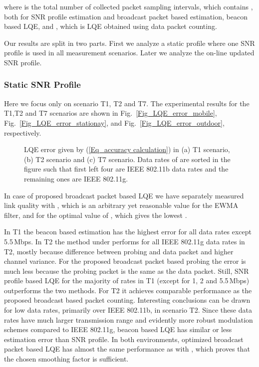 \documentclass[11pt,draftclsnofoot,journal,onecolumn]{IEEEtran}
\begin{document}
where  is the total number of collected packet sampling intervals, which contains , both for SNR profile estimation and broadcast packet based estimation, beacon based LQE, and , which is LQE obtained using data packet counting.

Our results are split in two parts. First we analyze a static profile where one SNR profile is used in all measurement scenarios. Later we analyze the on-line updated SNR profile.

\subsubsection{Static SNR Profile}
\label{sec:result_static_profile}

Here we focus only on scenario T1, T2 and T7. The experimental
results for the T1,T2 and T7 scenarios are shown in
Fig.~\ref{Fig_LQE_error_mobile}, Fig.~\ref{Fig_LQE_error_stationay},
and Fig.~\ref{Fig_LQE_error_outdoor}, respectively.
\begin{figure}
\centering
{}
\caption{LQE error  given by (\ref{Eq_accuracy calculation}) in (a) T1 scenario, (b) T2 scenario and (c) T7 scenario. Data rates of  are sorted in the figure such that first left four are IEEE 802.11b data rates and the remaining ones are IEEE 802.11g.}
\end{figure}


In case of proposed broadcast packet based LQE we have separately measured link quality with , which is an arbitrary yet reasonable value for the EWMA filter, and for the optimal value of , which gives the lowest .

In T1 the beacon based estimation has the highest error for all data rates except 5.5\,Mbps. In T2 the method under performs for all IEEE 802.11g data rates in T2, mostly because difference between probing and data packet and higher channel variance. For the proposed broadcast packet based probing the error is much less because the probing packet is the same as the data packet. Still, SNR profile based LQE for the majority of rates in T1 (except for 1, 2 and 5.5\,Mbps) outperforms the two methods. For T2 it achieves comparable performance as the proposed broadcast based packet counting. Interesting conclusions can be drawn for low data rates, primarily over IEEE 802.11b, in scenario T2. Since these data rates have much larger transmission range and evidently more robust modulation schemes compared to IEEE 802.11g, beacon based LQE has similar or less estimation error than SNR profile. In both environments, optimized broadcast packet based LQE has almost the same performance as with , which proves that the chosen smoothing factor is sufficient.
\end{document}
